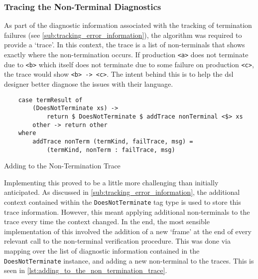 
\subsubsection{Tracing the Non-Terminal Diagnostics} %
\label{ssub:tracing_the_non_terminal_diagnostics}
As part of the diagnostic information associated with the tracking of termination failures (see \autoref{sub:tracking_error_information}), the algorithm was required to provide a `trace'.
In this context, the trace is a list of non-terminals that shows exactly where the non-termination occurs.
If production \texttt{<a>} does not terminate due to \texttt{<b>} which itself does not terminate due to some failure on production \texttt{<c>}, the trace would show \texttt{<b> -> <c>}.
The intent behind this is to help the \gls{dsl} designer better diagnose the issues with their language.

\begin{listing}[!htb]
\begin{verbatim}
    case termResult of
        (DoesNotTerminate xs) ->
            return $ DoesNotTerminate $ addTrace nonTerminal <$> xs
        other -> return other
    where
        addTrace nonTerm (termKind, failTrace, msg) =
            (termKind, nonTerm : failTrace, msg)
\end{verbatim}
\caption{Adding to the Non-Termination Trace}
\label{lst:adding_to_the_non_termination_trace}
\end{listing}

Implementing this proved to be a little more challenging than initially anticipated. 
As discussed in \autoref{sub:tracking_error_information}, the additional context contained within the \texttt{DoesNotTerminate} tag type is used to store this trace information.
However, this meant applying additional non-terminals to the trace every time the context changed.
In the end, the most sensible implementation of this involved the addition of a new `frame' at the end of every relevant call to the non-terminal verification procedure. 
This was done via mapping over the list of diagnostic information contained in the \texttt{DoesNotTerminate} instance, and adding a new non-terminal to the traces. 
This is seen in \autoref{lst:adding_to_the_non_termination_trace}.




